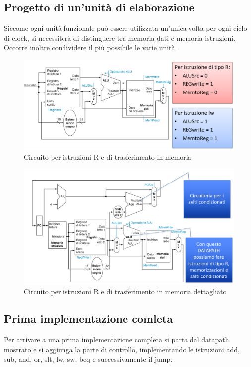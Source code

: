 \subsection{Progetto di un'unit\`a di elaborazione}
Siccome ogni unit\`a funzionale pu\`o essere utilizzata un'unica volta per ogni ciclo di clock, si necessiter\`a di distinguere tra memoria dati e memoria istruzioni. 
Occorre inoltre condividere il pi\`u possibile le varie unit\`a. 
\newpage
\begin{figure}
  \includegraphics[scale=0.2]{Pictures/RMemoria.png}
  \caption{Circuito per istruzioni R e di trasferimento in memoria}
  \label{fig:boat1}
\end{figure}
\begin{figure}
  \includegraphics[scale=0.2]{Pictures/RMemoriaCompleto.png}
  \caption{Circuito per istruzioni R e di trasferimento in memoria dettagliato}
  \label{fig:boat1}
\end{figure}
\subsection{Prima implementazione comleta}
Per arrivare a una prima implementazione completa si parta dal datapath mostrato e si aggiunga la parte di controllo, implementando le istruzioni add, sub, and, or, slt, 
lw, sw, beq e successivamente il jump. 
